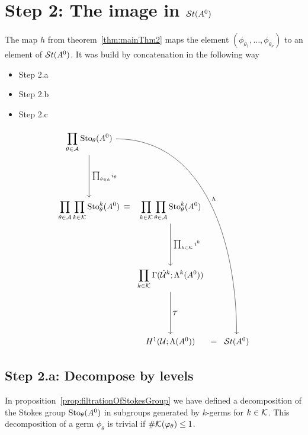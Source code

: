 \section{Step 2: The image in $\mathcal{S}{}t(A^0)$}
The map $h$ from theorem~\ref{thm:mainThm2} maps the element
$(\phi_{\theta_1},\dots,\phi_{\theta_\nu})$ to an element of $\mathcal{S}{}t(A^0)$.
It was build by concatenation in the following way
\bgroup
{}
\begin{paracol}{2}\sloppy
\switchcolumn[0]\noindent
  \vspace*{40mm}
  \begin{itemize}
    \item[] Step 2.a 
    \item[] \qquad Step 2.b 
    \item[] \qquad \qquad Step 2.c 
  \end{itemize}
\switchcolumn[1]\noindent
  \[ \begin{tikzcd}[column sep=0,row sep=1.8cm]
      \displaystyle \prod_{\theta\in\cA}\Sto_\theta(A^0)
      \dar{\tikzmark{e1}\prod_{\theta\in\A}i_\theta}
      \arrow[dddrrrr, out=0,in=90,"h"]
    \\\displaystyle \prod_{\theta\in\cA}\prod_{k\in\cK}\Sto_\theta^k(A^0)
    &\tikzmark{e2}\!\!\!\!\equiv
    &\displaystyle \prod_{k\in\cK}\prod_{\theta\in\cA}\Sto_\theta^k(A^0)
      \dar{\tikzmark{e3}\prod_{k\in\cK}i^k}
    \\&&\displaystyle \prod_{k\in\cK}\Gamma(\dot\cU^k;\Lambda^k(A^0))
      \dar{\tikzmark{e4}\cT}
    \\&&H^1(\cU;\Lambda(A^0))&=&\St(A^0)
  \end{tikzcd} \]
\end{paracol}
\egroup

\subsection{Step 2.a: Decompose by levels}
In proposition~\ref{prop:filtrationOfStokesGroup} we have defined a
decomposition of the Stokes group $\operatorname{Sto}_\theta(A^0)$ in subgroups generated by
$k$-germs for $k\in\mathcal{K}$.
This decomposition of a germ $\phi_\theta$ is trivial if
$\#\mathcal{K}(\varphi_\theta)\leq1$.


